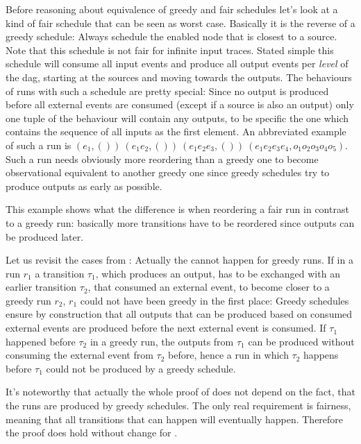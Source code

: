 Before reasoning about equivalence of greedy and fair schedules let's look at a kind of fair schedule that can be seen as worst case.
Basically it is the reverse of a greedy schedule: Always schedule the enabled node that is closest to a source.
Note that this schedule is not fair for infinite input traces.
Stated simple this schedule will consume all input events and produce all output events per \emph{level} of the \gls{dag}, starting at the sources and moving towards the outputs.
The behaviours of runs with such a schedule are pretty special: Since no output is produced before all external events are consumed (except if a source is also an output) only one tuple of the behaviour will contain any outputs, to be specific the one which contains the sequence of all inputs as the first element.
An abbreviated example of such a run is \((e_1,())\ (e_1e_2,())\ (e_1e_2e_3,())\ (e_1e_2e_3e_4,o_1o_2o_3o_4o_5)\).
Such a run needs obviously more reordering than a greedy one to become observational equivalent to another greedy one since greedy schedules try to produce outputs as early as possible.

This example shows what the difference is when reordering a fair run in contrast to a greedy run: basically more transitions have to be reordered since outputs can be produced later.

Let us revisit the cases from :
Actually the  cannot happen for greedy runs.
If in a run \(r_1\) a transition \(\tau_1\), which produces an output, has to be exchanged with an earlier transition \(\tau_2\), that consumed an external event, to become closer to a greedy run \(r_2\), \(r_1\) could not have been greedy in the first place:
Greedy schedules ensure by construction that all outputs that can be produced based on consumed external events are produced before the next external event is consumed.
If \(\tau_1\) happened before \(\tau_2\) in a greedy run, the outputs from \(\tau_1\) can be produced without consuming the external event from \(\tau_2\) before, hence a run in which \(\tau_2\) happens before \(\tau_1\) could not be produced by a greedy schedule.

It's noteworthy that actually the whole proof of  does not depend on the fact, that the runs are produced by greedy schedules.
The only real requirement is fairness, meaning that all transitions that can happen will eventually happen.
Therefore the proof does hold without change for .

